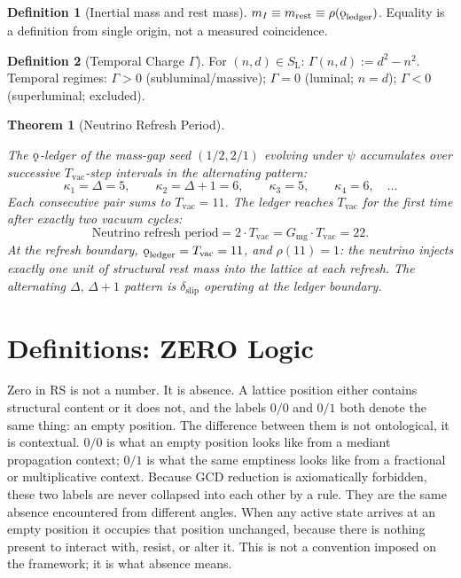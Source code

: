 \documentclass[11pt, letterpaper]{article}
\newcommand{\SL}{S_{\mathrm{L}}}
\newcommand{\rank}{\rho}
\newcommand{\koppa}{\mathbin{\text{\rm\k{o}}}}
\newcommand{\Tcharge}{\Gamma}
\theoremstyle{definition}
\newtheorem{definition}{Definition}[section]
\theoremstyle{plain}
\newtheorem{theorem}{Theorem}[section]
\begin{document}
\begin{definition}[Inertial mass and rest mass]\label{def:inertial-mass}
$m_I\equiv m_{\mathrm{rest}}\equiv\rank(\koppa_{\mathrm{ledger}})$.  Equality
is a definition from single origin, not a measured coincidence.
\end{definition}

\begin{definition}[Temporal Charge $\Tcharge$]\label{def:temporal-charge}
For $(n,d)\in\SL$: $\Tcharge(n,d):=d^2-n^2$.  Temporal regimes:
$\Tcharge>0$ (subluminal/massive); $\Tcharge=0$ (luminal; $n=d$);
$\Tcharge<0$ (superluminal; excluded).
\end{definition}

\begin{theorem}[Neutrino Refresh Period]\label{thm:neutrino-refresh}
\begin{rsbox}
The $\koppa$-ledger of the mass-gap seed $(1/2, 2/1)$ evolving under $\psi$
accumulates over successive $T_{\mathrm{vac}}$-step intervals in the
alternating pattern:
\[
\kappa_1 = \Delta = 5,\qquad
\kappa_2 = \Delta+1 = 6,\qquad
\kappa_3 = 5,\qquad
\kappa_4 = 6,\quad\ldots
\]
Each consecutive pair sums to $T_{\mathrm{vac}} = 11$.  The ledger reaches
$T_{\mathrm{vac}}$ for the first time after exactly two vacuum cycles:
\[
\text{Neutrino refresh period}
= 2 \cdot T_{\mathrm{vac}}
= G_{\mathrm{mg}} \cdot T_{\mathrm{vac}}
= 22.
\]
At the refresh boundary, $\koppa_{\mathrm{ledger}} = T_{\mathrm{vac}} = 11$,
and $\rank(11) = 1$: the neutrino injects exactly one unit of structural
rest mass into the lattice at each refresh.  The alternating
$\Delta,\,\Delta+1$ pattern is $\delta_{\mathrm{slip}}$ operating at the
ledger boundary.
\end{rsbox}
\end{theorem}

\newpage


\section{Definitions: ZERO Logic}\label{sec:zero}

Zero in RS is not a number. It is absence. A lattice position either contains
structural content or it does not, and the labels $0/0$ and $0/1$ both denote the
same thing: an empty position.  The difference between them is not ontological, it
is contextual.  $0/0$ is what an empty position looks like from a mediant propagation
context; $0/1$ is what the same emptiness looks like from a fractional or
multiplicative context.  Because GCD reduction is axiomatically forbidden, these two
labels are never collapsed into each other by a rule. They are the same absence
encountered from different angles.  When any active state arrives at an empty
position it occupies that position unchanged, because there is nothing present to
interact with, resist, or alter it.  This is not a convention imposed on the
framework; it is what absence means.
\end{document}
